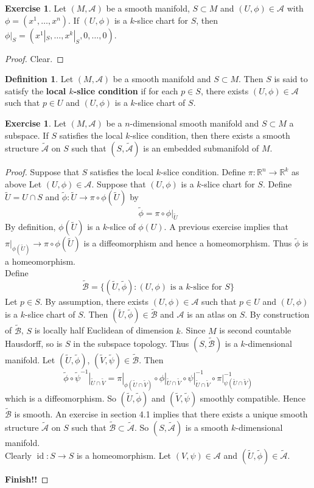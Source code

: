 \documentclass{book}
\theoremstyle{definition}
\newtheorem{defn}[definition]{Definition}
\newtheorem{ex}[definition]{Exercise}
\newcommand{\R}{\mathbb{R}}
\newcommand{\MA}{\mathcal{A}}
\newcommand{\MB}{\mathcal{B}}
\newcommand{\tMA}{\tilde{\MA}}
\newcommand{\tMB}{\tilde{\MB}}
\newcommand{\tU}{\tilde{U}}
\newcommand{\tV}{\tilde{V}}
\newcommand{\tphi}{\tilde{\phi}}
\newcommand{\tpsi}{\tilde{\psi}}
\DeclareMathOperator{\id}{id}
\DeclareMathOperator*{\0}{\mbf{0}}
\DeclareMathOperator*{\1}{\mbf{1}}
\begin{document}
	\begin{ex}
	Let $(M, \MA)$ be a smooth manifold, $S \subset M$ and $(U, \phi) \in \MA$ with $\phi = (x^1, \dots, x^n)$. If $(U, \phi)$ is a $k$-slice chart for $S$, then $\phi|_S = (x^1|_S, \dots, x^k|_S, 0, \dots, 0)$.
	\end{ex}
	
	\begin{proof}
	Clear. 
	\end{proof}
	
	\begin{defn}
	Let $(M, \MA)$ be a smooth manifold and $S \subset M$. Then $S$ is said to satisfy the \textbf{local $k$-slice condition} if for each $p \in S$, there exists $(U, \phi) \in \MA$ such that $p \in U$ and $(U, \phi)$ is a $k$-slice chart of $S$.
	\end{defn}
	
	\begin{ex}
	Let $(M, \MA)$ be a $n$-dimensional smooth manifold and $S \subset M$ a subspace. If $S$ satisfies the local $k$-slice condition, then there exists a smooth structure $\tMA$ on $S$ such that $(S, \tMA)$ is an embedded submanifold of $M$.
	\end{ex}	
	
	\begin{proof}
	Suppose that $S$ satisfies the local $k$-slice condition. Define $\pi: \R^n \rightarrow \R^k$ as above Let $(U, \phi) \in \MA$. Suppose that $(U, \phi)$ is a $k$-slice chart for $S$. Define $\tU = U \cap S$ and $\tphi: \tU \rightarrow \pi \circ \phi(\tU)$ by $$\tphi = \pi \circ \phi|_{\tU}$$ By definition, $\phi(\tU)$ is a $k$-slice of $\phi(U)$. A previous exercise implies that $\pi|_{\phi(\tU)} \rightarrow \pi \circ \phi(\tU)$ is a diffeomorphism and hence a homeomorphism. Thus $\tphi$ is a homeomorphism.\\
	Define $$\tMB = \{(\tU, \tphi): (U, \phi) \text{ is a $k$-slice for $S$} \}$$
	Let $p \in S$. By assumption, there exists $(U, \phi) \in \MA$ such that $p \in U$ and $(U, \phi)$ is a $k$-slice chart of $S$. Then $(\tU, \tphi) \in \tMB$ and $\MA$ is an atlas on $S$. By construction of $\tMB$, $S$ is locally half Euclidean of dimension $k$.  Since $M$ is second countable Hausdorff, so is $S$ in the subspace topology. Thus $(S, \tMB)$ is a $k$-dimensional manifold.
	Let $(\tU, \tphi)$, $(\tV, \tpsi) \in \tMB$. Then
	$$\tphi \circ \tpsi^{-1}|_{\tU \cap \tV} = \pi|_{\phi(\tU \cap \tV)} \circ \phi|_{\tU \cap \tV} \circ \psi|_{\tU \cap \tV}^{-1} \circ \pi|_{\psi(\tU \cap \tV)}^{-1} $$
	which is a diffeomorphism. So $(\tU, \tphi)$ and $(\tV, \tpsi)$ smoothly compatible. Hence $\tMB$ is smooth. An exercise in section 4.1 implies that there exists a unique smooth structure $\tMA$ on $S$ such that $\tMB \subset \tMA$. So $(S, \tMA)$ is a smooth $k$-dimensional manifold.\\
	Clearly $\id: S \rightarrow S$ is a homeomorphism. Let $(V, \psi) \in \MA$ and $(\tU, \tphi) \in \tMA$. 
	
	\textbf{Finish!!}
	\end{proof}
	
\end{document}
